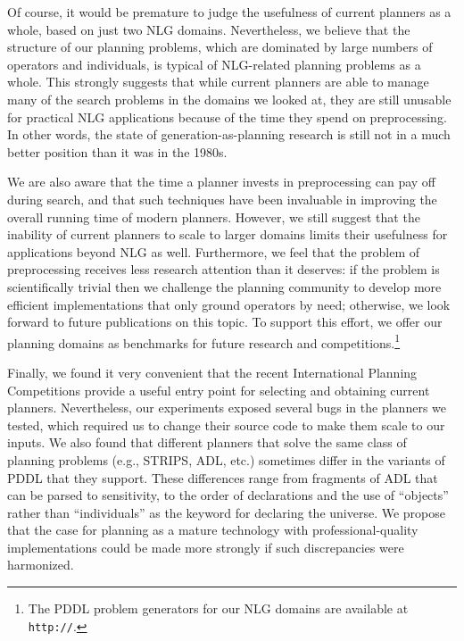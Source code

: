 Of course, it would be premature to judge the usefulness of current planners
as a whole, based on just two NLG domains. Nevertheless, we believe that the
structure of our planning problems, which are dominated by large numbers of
operators and individuals, is typical of NLG-related planning problems as a
whole. This strongly suggests that while current planners are able to manage
many of the search problems in the domains we looked at, they are still
unusable for practical NLG applications because of the time they spend on
preprocessing. In other words, the state of generation-as-planning research
is still not in a much better position than it was in the 1980s. 

We are also aware that the time a planner invests in preprocessing can pay
off during search, and that such techniques have been invaluable in improving
the overall running time of modern planners. However, we still suggest that
the inability of current planners to scale to larger domains limits their
usefulness for applications beyond NLG as well. Furthermore, we feel that the
problem of preprocessing receives less research attention than it deserves:
if the problem is scientifically trivial then we challenge the planning
community to develop more efficient implementations that only ground
operators by need; otherwise, we look forward to future publications on this
topic. To support this effort, we offer our planning domains as benchmarks
for future research and competitions.\footnote{The PDDL problem generators
for our NLG domains are available at \texttt{http://}.}

Finally, we found it very convenient that the recent International Planning
Competitions provide a useful entry point for selecting and obtaining current
planners. Nevertheless, our experiments exposed several bugs in the planners
we tested, which required us to change their source code to make them scale
to our inputs. We also found that different planners that solve the same
class of planning problems (e.g., STRIPS, ADL, etc.) sometimes differ in the
variants of PDDL that they support. These differences range from fragments of
ADL that can be parsed to sensitivity, to the order of declarations and the
use of ``objects'' rather than ``individuals'' as the keyword for declaring
the universe. We propose that the case for planning as a mature technology
with professional-quality implementations could be made more strongly if such
discrepancies were harmonized.



